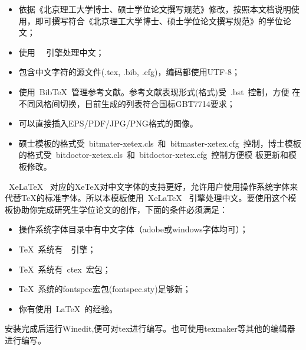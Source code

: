 \begin{itemize}
\item \inv 依据《北京理工大学博士、硕士学位论文撰写规范》修改，按照本文档说明使用，即可撰写符合《北京理工大学博士、硕士学位论文撰写规范》的学位论文；
\item \inv 使用~\XeTeX~ 引擎处理中文；
\item \inv 包含中文字符的源文件(.tex, .bib, .cfg)，编码都使用UTF-8；
\item \inv 使用~BibTeX~管理参考文献。参考文献表现形式(格式)受~.bst~控制，方便
  在不同风格间切换，目前生成的列表符合国标GBT7714要求；
\item \inv 可以直接插入EPS/PDF/JPG/PNG格式的图像。
\item \inv 硕士模板的格式受~bitmater-xetex.cls~和~bitmaster-xetex.cfg~控制，博士模板的格式受~bitdoctor-xetex.cls~和~bitdoctor-xetex.cfg~控制方便模
  板更新和模板修改。
\end{itemize}
 
~XeLaTeX~ 对应的XeTeX对中文字体的支持更好，允许用户使用操作系统字体来代替TeX的标准字体。所以本模板使用~XeLaTeX~ 引擎处理中文。要使用这个模板协助你完成研究生学位论文的创作，下面的条件必须满足：

\begin{itemize}
\item \inv 操作系统字体目录中有中文字体（adobe或windows字体均可）；
\item \inv \TeX~系统有~\XeTeX~引擎；
\item \inv \TeX~系统有~ctex~宏包；
\item \inv \TeX~系统的fontspec宏包(fontspec.sty)足够新；
\item \inv 你有使用~\LaTeX~的经验。
\end{itemize}

安装完成后运行Winedit,便可对tex进行编写。也可使用texmaker等其他的编辑器进行编写。



